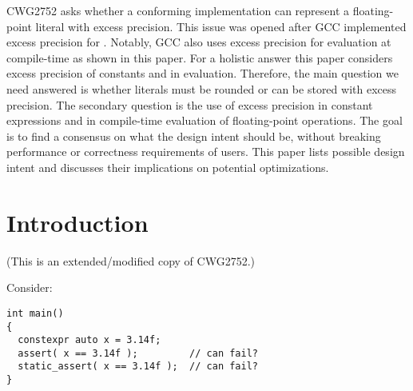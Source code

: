 \newcommand\wgTitle{Floating-Point Excess Precision}
\newcommand\wgName{Matthias Kretz <m.kretz@gsi.de>}
\newcommand\wgDocumentNumber{D3488R0}
\newcommand\wgGroup{SG6, EWG}
\newcommand\wgTarget{\CC{}26}

\usepackage{mymacros}
\usepackage{wg21}
\usepackage{changelog}
\usepackage{underscore}



\renewcommand{\lst}[1]{Listing~\ref{#1}}
\renewcommand{\sect}[1]{Section~\ref{#1}}
\renewcommand{\ttref}[1]{Tony~Table~\ref{#1}}
\newcommand\fp{floating-point\xspace}
\newcommand\Fp{Floating-point\xspace}
\newcommand\discussionref[1]{\hyperref[d:#1]{\color{Headings}$\rightarrow$ Discussion}}


\begin{wgTitlepage}
  CWG2752 asks whether a conforming implementation can represent a \fp literal
  with excess precision.
  This issue was opened after GCC implemented excess precision for \CC{}.
  Notably, GCC also uses excess precision for evaluation at compile-time as
  shown in this paper.
  For a holistic answer this paper considers excess precision of constants and
  in evaluation.
  Therefore, the main question we need answered is whether literals must be
  rounded or can be stored with excess precision.
  The secondary question is the use of excess precision in constant expressions
  and in compile-time evaluation of floating-point operations.
  The goal is to find a consensus on what the design intent should be, without
  breaking performance or correctness requirements of \CC{} users.
  This paper lists possible design intent and discusses their implications on
  potential optimizations.
\end{wgTitlepage}

\pagestyle{scrheadings}




\section{Introduction}

(This is an extended/modified copy of CWG2752.)

Consider:

\begin{lstlisting}
int main()
{
  constexpr auto x = 3.14f;
  assert( x == 3.14f );         // can fail?
  static_assert( x == 3.14f );  // can fail?
}
\end{lstlisting}

